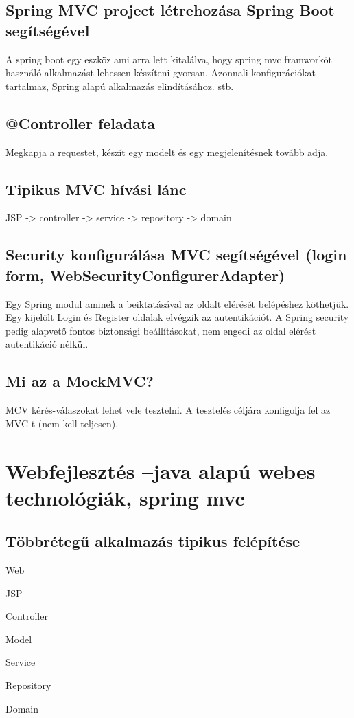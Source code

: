 \documentclass[a4paper,14pt]{extarticle}
\begin{document}
		\subsection{Spring MVC project létrehozása Spring Boot segítségével}
		A spring boot egy eszköz ami arra lett kitalálva, hogy spring mvc framworköt használó alkalmazást lehessen készíteni gyorsan. Azonnali konfigurációkat tartalmaz, Spring alapú alkalmazás elindításához. stb. 
		\subsection{@Controller feladata}
		Megkapja a requestet, készít egy modelt és egy megjelenítésnek tovább adja.
		\subsection{Tipikus MVC  hívási lánc}
		JSP -> controller -> service -> repository -> domain 
		\subsection{Security konfigurálása MVC segítségével (login form, WebSecurityConfigurerAdapter)}
		Egy Spring modul aminek a beiktatásával az oldalt elérését belépéshez köthetjük. Egy kijelölt Login és Register oldalak elvégzik az autentikációt. A Spring security pedig alapvető fontos biztonsági beállításokat, nem engedi az oldal elérést autentikáció nélkül.
		\subsection{Mi az a MockMVC?}
		MCV kérés-válaszokat lehet vele tesztelni.  A tesztelés céljára konfigolja fel az MVC-t (nem kell teljesen).
	\section{Webfejlesztés –java alapú webes technológiák, spring mvc}
		\subsection{Többrétegű alkalmazás tipikus felépítése}
			\begin{compactitem}
				\item{ 
					Web 
					\begin{compactitem}
						\item JSP
						\item Controller
						\item Model
					\end{compactitem}	
				}
				\item Service
				\item Repository
				\item Domain
			\end{compactitem}
\end{document}
